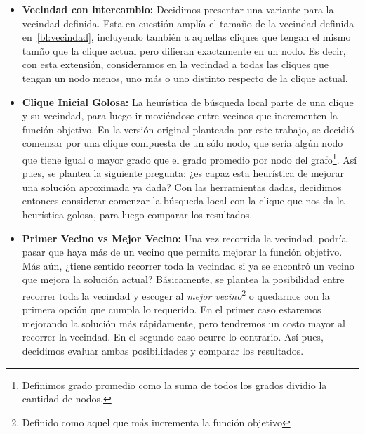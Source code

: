 \begin{itemize}
    \item \textbf{Vecindad con intercambio:} Decidimos presentar una variante
        para la vecindad definida. Esta en cuesti\'on ampl\'ia el tama\~no
        de la vecindad definida en~\ref{bl:vecindad}, incluyendo tambi\'en a aquellas
        cliques que tengan el mismo tam\~no que la clique actual pero difieran
        exactamente en un nodo. Es decir, con esta extensi\'on, consideramos
        en la vecindad a todas las cliques que tengan un nodo menos, uno m\'as o
        uno distinto respecto de la clique actual.

    \item \textbf{Clique Inicial Golosa:} La heur\'istica de b\'usqueda local parte
        de una clique y su vecindad, para luego ir movi\'endose entre vecinos
        que incrementen la funci\'on objetivo. En la versi\'on original
        planteada por este trabajo, se decidi\'o comenzar por una clique compuesta
        de un s\'olo nodo, que ser\'ia alg\'un nodo que tiene igual o mayor
        grado que el grado promedio por nodo del grafo\footnote{Definimos grado
        promedio como la suma de todos los grados dividio la cantidad de nodos.}.
        As\'i pues, se plantea la siguiente pregunta: ¿es capaz esta heur\'istica
        de mejorar una soluci\'on aproximada ya dada? Con las herramientas dadas,
        decidimos entonces considerar comenzar la b\'usqueda local con la clique
        que nos da la heur\'istica golosa, para luego comparar los resultados.

    \item \textbf{Primer Vecino vs Mejor Vecino:} Una vez recorrida la vecindad,
        podr\'ia pasar que haya m\'as de un vecino que permita mejorar la
        funci\'on objetivo. M\'as a\'un, ¿tiene sentido recorrer toda la vecindad
        si ya se encontr\'o un vecino que mejora la soluci\'on actual? B\'asicamente,
        se plantea la posibilidad entre recorrer toda la vecindad y escoger al
        \emph{mejor vecino}\footnote{Definido como aquel que m\'as incrementa
        la funci\'on objetivo} o quedarnos con la primera opci\'on que cumpla
        lo requerido. En el primer caso estaremos mejorando la soluci\'on m\'as
        r\'apidamente, pero tendremos un costo mayor al recorrer la vecindad. En
        el segundo caso ocurre lo contrario. As\'i pues, decidimos evaluar
        ambas posibilidades y comparar los resultados.
\end{itemize}


